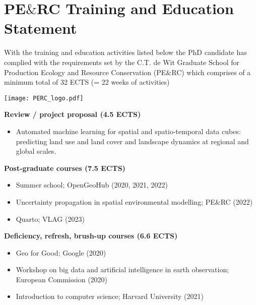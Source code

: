 \chapter{PE$\&$RC Training and Education Statement }

\begin{minipage}[c]{.55\textwidth}

With the training and education activities listed below the PhD candidate has complied with the requirements set by the C.T. de Wit Graduate School for Production Ecology and Resource Conservation (PE$\&$RC) which comprises of a minimum total of 32 ECTS (= 22 weeks of activities) 
\end{minipage}
\begin{minipage}[c]{.35\textwidth}
\begin{flushright}
\vspace{0pt}\texttt{[image: PERC\_logo.pdf]}
\end{flushright}
\end{minipage}%

\bigskip

\textbf{Review / project proposal (4.5 ECTS)}
\begin{itemize}[nolistsep]
    \item Automated machine learning for spatial and spatio-temporal data cubes: predicting land use and land cover and landscape dynamics at regional and global scales.
\end{itemize}

\textbf{Post-graduate courses (7.5 ECTS)}
\begin{itemize}[nolistsep]
    \item Summer school; OpenGeoHub (2020, 2021, 2022)
    \item Uncertainty propagation in spatial environmental modelling; PE\&RC (2022)
    \item Quarto; VLAG (2023)
\end{itemize}

\textbf{Deficiency, refresh, brush-up courses (6.6 ECTS)}
\begin{itemize}[nolistsep]
    \item Geo for Good; Google (2020)
    \item Workshop on big data and artificial intelligence in earth observation; European Commission (2020)
    \item Introduction to computer science; Harvard University (2021)
\end{itemize}


